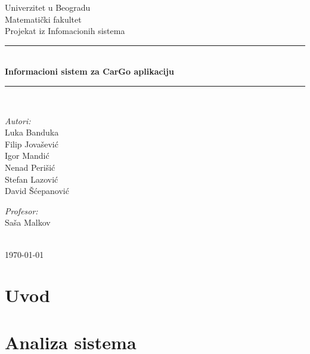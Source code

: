 \documentclass{article}
\begin{document}
\begin{titlepage}

\newcommand{\HRule}{\rule{\linewidth}{0.5mm}}
\center
\textup{\Large Univerzitet u Beogradu\\Matemati\v cki fakultet}\\[1.5cm]
\textup{\Large Projekat iz Infomacionih sistema}\\[0.4cm]

\HRule \\[0.4cm]
{ \huge \bfseries Informacioni sistem za CarGo aplikaciju}\\[0.4cm]
\HRule \\[8.5cm]

\begin{minipage}{0.4\textwidth}
\begin{flushleft}
\large
\emph{Autori:}\\
\textup Luka Banduka\\
\textup Filip Jova\v sevi\' c\\
\textup Igor Mandi\' c\\
\textup Nenad Peri\v si\' c\\
\textup Stefan Lazovi\' c\\
\textup David \v S\' cepanovi\' c

\end{flushleft}
\end{minipage}
\hfill
\begin{minipage}{0.4\textwidth}
\begin{flushright}
\large
\emph{Profesor:} \\
\textup Sa\v sa Malkov\\
\end{flushright}
\end{minipage}\\[2cm]


{\textup \large \today}\\[1cm]

\end{titlepage}

\newpage
\tableofcontents

\newpage
\section{\bfseries Uvod}


\section{\bfseries Analiza sistema}
\end{document}
